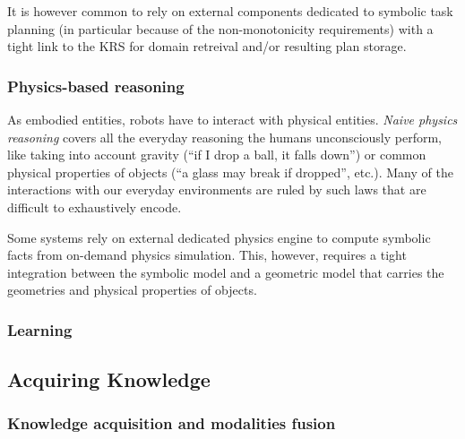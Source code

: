 \documentclass[a4paper, twocolumn]{article}
\begin{document}
It is however common to rely on external components dedicated to symbolic task
planning (in particular because of the non-monotonicity requirements) with a
tight link to the KRS for domain retreival and/or resulting plan storage.


\subsubsection{Physics-based reasoning}
\label{sect|physics}

As embodied entities, robots have to interact with physical entities.
\emph{Naive physics reasoning} covers all the everyday reasoning the humans
unconsciously perform, like taking into account gravity (``if I drop a ball, it
falls down'') or common physical properties of objects (``a glass may break if
dropped'', etc.). Many of the interactions with our everyday environments are
ruled by such laws that are difficult to exhaustively encode.

Some systems \cite{Kunze2011a} rely on external dedicated physics engine to
compute symbolic facts from on-demand physics simulation. This, however,
requires a tight integration between the symbolic model and a geometric model
that carries the geometries and physical properties of objects.

\subsubsection{Learning}
\label{sect|learning}

\subsection{Acquiring Knowledge}

\begin{scriptsize}
\begin{center}
\end{center}
\end{scriptsize}

\subsubsection{Knowledge acquisition and modalities fusion}
\label{sect|knowledge-acquisition}
\end{document}
